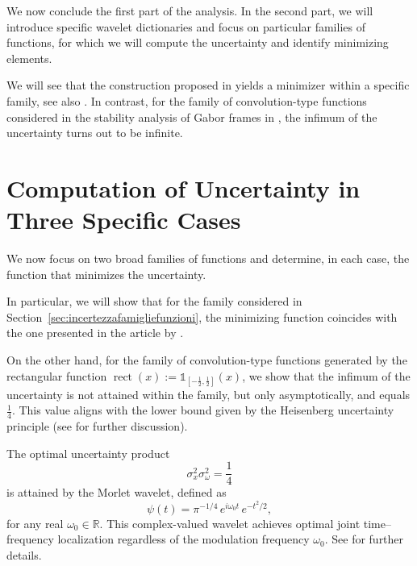 \documentclass[preprint,hidelinks,authoryear]{elsarticle}
\theoremstyle{plain}
\theoremstyle{definition}
\theoremstyle{remark}
\begin{document}
We now conclude the first part of the analysis. In the second part, we will introduce specific wavelet dictionaries and focus on particular families of functions, for which we will compute the uncertainty and identify minimizing elements.

We will see that the construction proposed in \cite{mazzoccoli2024refining} yields a minimizer within a specific family, see also \cite{rivero2023solution}. In contrast, for the family of convolution-type functions considered in the stability analysis of Gabor frames in \cite{de2018stability}, the infimum of the uncertainty turns out to be infinite.



\section{Computation of Uncertainty in Three Specific Cases}
\label{sec3}

We now focus on two broad families of functions and determine, in each case, the function that minimizes the uncertainty.

In particular, we will show that for the family considered in Section~\ref{sec:incertezzafamigliefunzioni}, the minimizing function coincides with the one presented in the article by \cite{mazzoccoli2024refining}.

On the other hand, for the family of convolution-type functions generated by the rectangular function $ \operatorname{rect}(x) := \mathds{1}_{[-\frac{1}{2},\frac{1}{2}]}(x) $, we show that the infimum of the uncertainty is not attained within the family, but only asymptotically, and equals $ \frac{1}{4} $. This value aligns with the lower bound given by the Heisenberg uncertainty principle (see \cite{busch2007heisenberg} for further discussion). 

The optimal uncertainty product
\begin{equation}
\sigma^2_x \sigma^2_{\omega} = \frac{1}{4}
\end{equation} 
is attained by the Morlet wavelet, defined as
\begin{equation}
\psi(t) = \pi^{-1/4} \, e^{i \omega_0 t} \, e^{-t^2/2},
\end{equation}
for any real $ \omega_0 \in \mathbb{R} $. This complex-valued wavelet achieves optimal joint time–frequency localization regardless of the modulation frequency $ \omega_0 $. See \cite{mallat1999wavelet} for further details.
\end{document}
